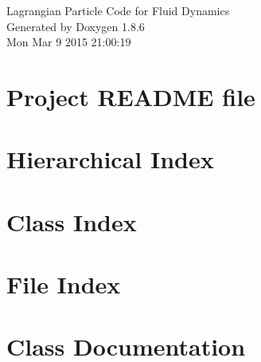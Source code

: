\documentclass[twoside]{book}
\newcommand{\clearemptydoublepage}{%
  \newpage{\pagestyle{empty}\cleardoublepage}%
}
\begin{document}
\hypersetup{pageanchor=false}
\begin{titlepage}
\vspace*{7cm}
\begin{center}%
{\Large Lagrangian Particle Code for Fluid Dynamics }\\
\vspace*{1cm}
{\large Generated by Doxygen 1.8.6}\\
\vspace*{0.5cm}
{\small Mon Mar 9 2015 21:00:19}\\
\end{center}
\end{titlepage}
\clearemptydoublepage
\tableofcontents
\clearemptydoublepage
{}
\hypersetup{pageanchor=true}

\chapter{Project R\-E\-A\-D\-M\-E file}
\label{md_README}
\hypertarget{md_README}{}

\chapter{Hierarchical Index}

\chapter{Class Index}

\chapter{File Index}

\chapter{Class Documentation}



































\end{document}
